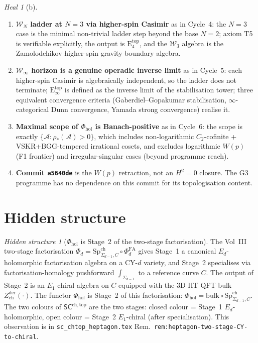 \documentclass{article}
\theoremstyle{definition}
\theoremstyle{remark}
\newtheorem{heal}[theorem]{Heal}
\newtheorem{hidden}[theorem]{Hidden structure}
\newcommand{\SCchtop}{\mathsf{SC}^{\mathrm{ch,top}}}
\newcommand{\Phihol}{\Phi_{\mathrm{hol}}}
\newcommand{\Zder}{Z^{\mathrm{der}}_{\mathrm{ch}}}
\newcommand{\Etop}[1]{\mathrm{E}_{#1}^{\mathrm{top}}}
\newcommand{\cW}{\mathcal{W}}
\newcommand{\cA}{\mathcal{A}}
\begin{document}
\begin{heal}[b]
\begin{enumerate}
\item \textbf{$\cW_N$ ladder at $N=3$ via higher-spin
Casimir} as in Cycle~4: the $N=3$ case is the minimal
non-trivial ladder step beyond the base $N=2$; axiom T5 is
verifiable explicitly, the output is $\Etop{4}$, and
the $\cW_3$ algebra is the Zamolodchikov higher-spin
gravity boundary algebra.

\item \textbf{$\cW_\infty$ horizon is a genuine operadic
inverse limit} as in Cycle~5: each higher-spin Casimir is
algebraically independent, so the ladder does not
terminate; $\Etop{\infty}$ is defined as the inverse limit
of the stabilisation tower; three equivalent convergence
criteria (Gaberdiel--Gopakumar stabilisation,
$\infty$-categorical Dunn convergence, Yamada strong
convergence) realise it.

\item \textbf{Maximal scope of $\Phihol$ is
Banach-positive} as in Cycle~6: the scope is exactly
$\{\cA : \rho_*(\cA) > 0\}$, which includes non-logarithmic
$C_2$-cofinite + VSKR+BGG-tempered irrational cosets, and
excludes logarithmic $W(p)$ (F1 frontier) and
irregular-singular cases (beyond programme reach).

\item \textbf{Commit \texttt{a5640de}} is the $W(p)$
retraction, not an $H^2 = 0$ closure. The G3 programme
has no dependence on this commit for its topologisation
content.
\end{enumerate}

\section{Hidden structure}
\label{sec:opus-hidden}

\begin{hidden}[$\Phihol$ is Stage~2 of the two-stage
factorisation]
\label{hidden:phi-hol-stage-2}
The Vol~III two-stage factorisation
$\Phi_d = \mathrm{Sp}^{\mathrm{ch}}_{\Sigma_{d-1}, C} \circ
\Phi^{\mathrm{FA}}_d$ gives Stage~1 a canonical
$E_d$-holomorphic factorisation algebra on a CY-$d$ variety,
and Stage~2 specialises via factorisation-homology
pushforward $\int_{\Sigma_{d-1}}$ to a reference curve $C$.
The output of Stage~2 is an $E_1$-chiral algebra on $C$
equipped with the 3D HT-QFT bulk
$\Zder(\cdot)$. The functor $\Phihol$ is Stage~2 of this
factorisation: $\Phihol = \mathrm{bulk} \circ
\mathrm{Sp}^{\mathrm{ch}}_{\Sigma_{d-1}, C}$. The two
colours of $\SCchtop$ are the two stages: closed colour =
Stage~1 $E_d$-holomorphic, open colour = Stage~2 $E_1$-chiral
(after specialisation). This observation is in
\texttt{sc\_chtop\_heptagon.tex}
Rem.~\texttt{rem:heptagon-two-stage-CY-to-chiral}.
\end{hidden}


\end{heal}
\end{document}
